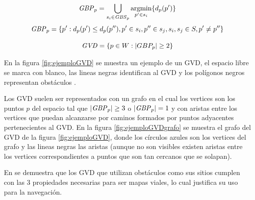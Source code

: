 \begin{equation}
  \mathit{GBP}_p =\bigcup_{s_i \in \mathit{GBS}_p} \operatorname*{argmin}_{p'\in s_i}\{d_p(p')\}\label{eq:GBP}
\end{equation}
\begin{equation}
  \mathit{GBP}_p =\{p' : d_p(p') \leq d_p(p''), p' \in s_i, p'' \in s_j, s_i,s_j \in S,p' \neq p''\}
\end{equation}

\begin{equation}
  \mathit{GVD}  = \{p \in W : |GBP_p| \geq 2\}\label{eq:GVD}
\end{equation}

En la figura \ref{fig:ejemploGVD} se muestra un ejemplo de un GVD, el espacio libre se marca con blanco, las lineas negras identifican al GVD y los polígonos negros representan obstáculos  . 

Los GVD suelen ser representados con un grafo en el cual los vertices son los puntos $p$ del espacio tal que $|\mathit{GBP}_p|\geq 3$ o $|\mathit{GBP}_p|= 1$ y con aristas entre los vertices que puedan alcanzarse por caminos formados por puntos adyacentes pertenecientes al GVD. En la figura \ref{fig:ejemploGVDgrafo} se muestra el grafo del GVD de la figura \ref{fig:ejemploGVD}, donde los círculos azules son los vertices del grafo y las lineas negras las aristas (aunque no son visibles existen aristas entre los vertices correspondientes a puntos que son tan cercanos que se solapan).

En \cite{choset2005principles} se demuestra que los GVD que utilizan obstáculos como sus sitios cumplen con las 3 propiedades necesarias para ser mapas viales, lo cual justifica su uso para la navegación.




